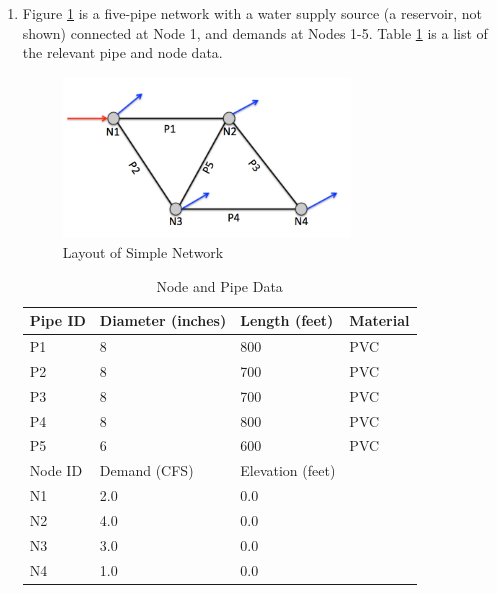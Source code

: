 \documentclass[12pt]{article}
\begin{document}
\begin{enumerate}

\item Figure \ref{fig:NetworkLayout} is a five-pipe network with a water supply source (a reservoir, not shown) connected at Node 1, and demands at Nodes 1-5.
Table \ref{tab:PipeData} is a list of the relevant pipe and node data.

\begin{figure}[h!] %
\centering
   \includegraphics[width=3in]{NetworkLayout.jpg}
   \caption{Layout of Simple Network}
   \label{fig:NetworkLayout} 
\end{figure}

\begin{table}[htbp]
   \centering
   \caption{Node and Pipe Data}
    \begin{tabular}{p{1in} p{1in} p{1in} p{1in} } %
    \hline
    \hline
Pipe ID & Diameter (inches) & Length (feet) & Material \\
\hline
P1 & 8 & 800 & PVC  \\
P2 & 8 & 700 & PVC  \\
P3 & 8 & 700 & PVC  \\
P4 & 8 & 800 & PVC  \\
P5 & 6 & 600 & PVC  \\
\hline
\hline
Node ID & Demand (CFS) & Elevation (feet) & ~~ \\
\hline
N1 & 2.0 & 0.0 & ~~ \\
N2 & 4.0 & 0.0 & ~~ \\
N3 & 3.0 & 0.0 & ~~ \\
N4 & 1.0 & 0.0 & ~~ \\
   \end{tabular}
   \label{tab:PipeData}
\end{table}
\clearpage


\end{enumerate}
\end{document}
